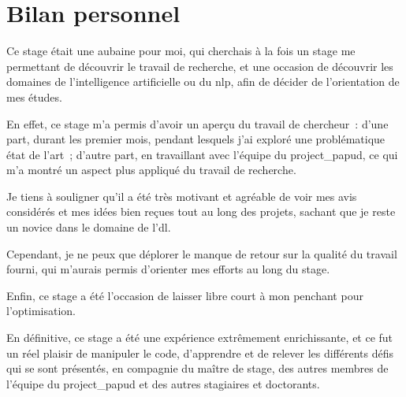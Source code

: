 \section{Bilan personnel}
Ce stage était une aubaine pour moi, qui cherchais à la fois un stage me permettant de découvrir le travail de recherche, et une occasion de découvrir les domaines de l'intelligence artificielle ou du \gls{nlp}, afin de décider de l'orientation de mes études.

En effet, ce stage m'a permis d'avoir un aperçu du travail de chercheur~:
d'une part, durant les premier mois, pendant lesquels j'ai exploré une problématique état de l'art~; d'autre part, en travaillant avec l'équipe du \gls{project_papud}, ce qui m'a montré un aspect plus appliqué du travail de recherche.

Je tiens à souligner qu'il a été très motivant et agréable de voir mes avis considérés et mes idées bien reçues tout au long des projets, sachant que je reste un novice dans le domaine de l'\gls{dl}.

Cependant, je ne peux que déplorer le manque de retour sur la qualité du travail fourni, qui m'aurais permis d'orienter mes efforts au long du stage.

Enfin, ce stage a été l'occasion de laisser libre court à mon penchant pour l'optimisation.

En définitive, ce stage a été une expérience extrêmement enrichissante, et ce fut un réel plaisir de manipuler le code, d'apprendre et de relever les différents défis qui se sont présentés, en compagnie du maître de stage, des autres membres de l'équipe du \gls{project_papud} et des autres stagiaires et doctorants.









